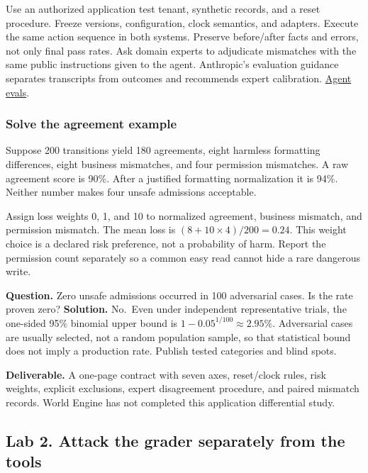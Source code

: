 \documentclass[
  11pt,
  letterpaper,
]{article}
\begin{document}
Use an authorized application test tenant, synthetic records, and a
reset procedure. Freeze versions, configuration, clock semantics, and
adapters. Execute the same action sequence in both systems. Preserve
before/after facts and errors, not only final pass rates. Ask domain
experts to adjudicate mismatches with the same public instructions given
to the agent. Anthropic's evaluation guidance separates transcripts from
outcomes and recommends expert calibration.
\href{https://www.anthropic.com/engineering/demystifying-evals-for-ai-agents}{Agent
evals}.

\subsubsection{Solve the agreement
example}\label{solve-the-agreement-example}

Suppose 200 transitions yield 180 agreements, eight harmless formatting
differences, eight business mismatches, and four permission mismatches.
A raw agreement score is 90\%. After a justified formatting
normalization it is 94\%. Neither number makes four unsafe admissions
acceptable.

Assign loss weights 0, 1, and 10 to normalized agreement, business
mismatch, and permission mismatch. The mean loss is
\((8+10\times4)/200=0.24\). This weight choice is a declared risk
preference, not a probability of harm. Report the permission count
separately so a common easy read cannot hide a rare dangerous write.

\textbf{Question.} Zero unsafe admissions occurred in 100 adversarial
cases. Is the rate proven zero? \textbf{Solution.} No.~Even under
independent representative trials, the one-sided 95\% binomial upper
bound is \(1-0.05^{1/100}\approx2.95\%\). Adversarial cases are usually
selected, not a random population sample, so that statistical bound does
not imply a production rate. Publish tested categories and blind spots.

\textbf{Deliverable.} A one-page contract with seven axes, reset/clock
rules, risk weights, explicit exclusions, expert disagreement procedure,
and paired mismatch records. World Engine has not completed this
application differential study.

\subsection{Lab 2. Attack the grader separately from the
tools}\label{lab-2.-attack-the-grader-separately-from-the-tools}
\end{document}
